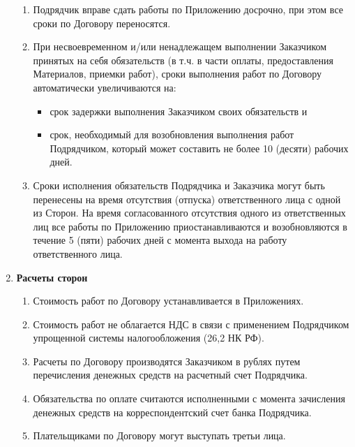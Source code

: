 \documentclass[14pt,a4paper]{article}
\begin{document}
\begin{enumerate}
\begin{enumerate}
		\item Подрядчик вправе сдать работы по Приложению досрочно, при этом все сроки по Договору переносятся.

		\item При несвоевременном и/или ненадлежащем выполнении Заказчиком принятых на себя обязательств (в т.ч. в части оплаты, предоставления Материалов, приемки работ), сроки выполнения работ по Договору автоматически увеличиваются на:
		\begin{itemize}
			\item срок задержки выполнения Заказчиком своих обязательств и
			\item срок, необходимый для возобновления выполнения работ Подрядчиком, который может составить не более 10 (десяти) рабочих дней.
		\end{itemize}

		\item Сроки исполнения обязательств Подрядчика и Заказчика могут быть перенесены на время отсутствия (отпуска) ответственного лица с одной из Сторон. На время согласованного отсутствия одного из ответственных лиц все работы по Приложению приостанавливаются и возобновляются в течение 5 (пяти) рабочих дней с момента выхода на работу ответственного лица.

	\end{enumerate}


	\item
	\begin{center}
	\textbf{Расчеты сторон}
	\end{center}
	\begin{enumerate}
		\item Стоимость работ по Договору устанавливается в Приложениях.
		
		\item Стоимость работ не облагается НДС в связи с применением Подрядчиком упрощенной системы налогообложения (26,2 НК РФ).
		
		\item Расчеты по Договору производятся Заказчиком в рублях путем перечисления денежных средств на расчетный счет Подрядчика.
		
		\item Обязательства по оплате считаются исполненными с момента зачисления денежных средств на корреспондентский счет банка Подрядчика.
		
		\item Плательщиками по Договору могут выступать третьи лица.
		

\end{enumerate}
\end{enumerate}
\end{document}
